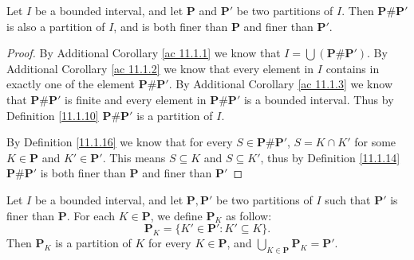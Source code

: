\setcounter{theorem}{17}
\begin{lemma}\label{11.1.18}
    Let \(I\) be a bounded interval, and let \(\mathbf{P}\) and \(\mathbf{P}'\) be two partitions of \(I\).
    Then \(\mathbf{P} \# \mathbf{P}'\) is also a partition of \(I\), and is both finer than \(\mathbf{P}\) and finer than \(\mathbf{P}'\).
\end{lemma}

\begin{proof}
    By Additional Corollary \ref{ac 11.1.1} we know that \(I = \bigcup (\mathbf{P} \# \mathbf{P}')\).
    By Additional Corollary \ref{ac 11.1.2} we know that every element in \(I\) contains in exactly one of the element \(\mathbf{P} \# \mathbf{P}'\).
    By Additional Corollary \ref{ac 11.1.3} we know that \(\mathbf{P} \# \mathbf{P}'\) is finite and every element in  \(\mathbf{P} \# \mathbf{P}'\) is a bounded interval.
    Thus by Definition \ref{11.1.10} \(\mathbf{P} \# \mathbf{P}'\) is a partition of \(I\).

    By Definition \ref{11.1.16} we know that for every \(S \in \mathbf{P} \# \mathbf{P}'\), \(S = K \cap K'\) for some \(K \in \mathbf{P}\) and \(K' \in \mathbf{P}'\).
    This means \(S \subseteq K\) and \(S \subseteq K'\), thus by Definition \ref{11.1.14} \(\mathbf{P} \# \mathbf{P}'\) is both finer than \(\mathbf{P}\) and finer than \(\mathbf{P}'\)
\end{proof}

\begin{additional corollary}\label{ac 11.1.4}
Let \(I\) be a bounded interval, and let \(\mathbf{P}, \mathbf{P}'\) be two partitions of \(I\) such that \(\mathbf{P}'\) is finer than \(\mathbf{P}\).
For each \(K \in \mathbf{P}\), we define \(\mathbf{P}_K\) as follow:
\[
    \mathbf{P}_K = \{K' \in \mathbf{P}' : K' \subseteq K\}.
\]
Then \(\mathbf{P}_K\) is a partition of \(K\) for every \(K \in \mathbf{P}\), and \(\bigcup_{K \in \mathbf{P}} \mathbf{P}_K = \mathbf{P}'\).
\end{additional corollary}

